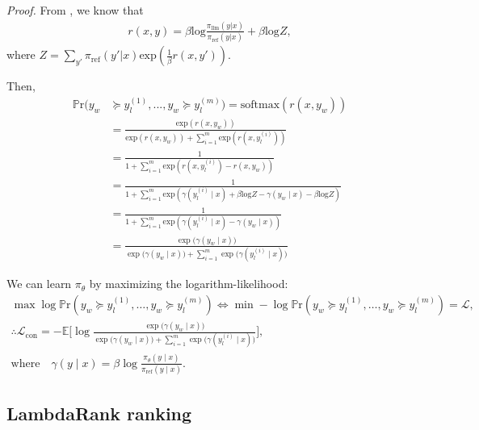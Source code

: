 \textit{Proof.}
From \citep{rafailov2024direct}, we know that
\begin{gather}
    r(x, y) = \beta \text{log} \frac{\pi_{\text{llm}}(y|x)}{\pi_{\text{ref}}(y|x)} + \beta \text{log} Z,
\end{gather}
where $Z = \sum_{y'} \pi_{\text{ref}}(y'|x) \text{exp}(\frac{1}{\beta} r(x, y'))$.

Then,
\begin{equation}\label{eq:1-n}
\begin{aligned}
\mathbb{P}\text{r}(y_w & \succeq y^{(1)}_l, ..., y_w \succeq y^{(m)}_l) 
= \text{softmax}(r(x, y_w)) \\
&= \frac{\text{exp}(r(x,y_w))}{\text{exp}(r(x,y_w)) + \sum^m_{i=1}\text{exp}(r(x,y^{(i)}_l))} \\
&= \frac{1}{1 + \sum^m_{i=1}\text{exp}(r(x,y^{(i)}_l)-r(x,y_w))} \\
&= \frac{1}{1 + \sum^m_{i=1}\text{exp}(\gamma(y^{(i)}_l \mid x) + \beta \text{log} Z - \gamma(y_w \mid x) - \beta \text{log} Z)} \\
&= \frac{1}{1 + \sum^m_{i=1}\text{exp}(\gamma(y^{(i)}_l \mid x) - \gamma(y_w \mid x))} \\
&= \frac{\exp\bigl(\gamma(y_w \mid x)\bigr)}{
        \exp\bigl(\gamma(y_w \mid x)\bigr) + \sum_{i=1}^m \exp\bigl(\gamma(y_l^{(i)} \mid x)\bigr)}
\end{aligned}
\end{equation}

We can learn $\pi_\theta$ by maximizing the logarithm-likelihood: 
\begin{gather}
\max \log \mathbb{P}\text{r}(y_w \succeq y^{(1)}_l, \dots, y_w \succeq y^{(m)}_l) \Leftrightarrow 
\min - \log \mathbb{P}\text{r}(y_w \succeq y^{(1)}_l, \dots, y_w \succeq y^{(m)}_l) = \mathcal{L}, \\
 \therefore \mathcal{L}_{\text{con}} = -\mathbb{E} \biggl[
    \log \frac{\exp\bigl(\gamma(y_w \mid x)\bigr)}{
        \exp\bigl(\gamma(y_w \mid x)\bigr) + \sum_{i=1}^m \exp\bigl(\gamma(y_l^{(i)} \mid x)\bigr)}
    \biggr], \\
\text{where} \quad \gamma(y \mid x) = \beta \log \frac{\pi_\theta(y \mid x)}{\pi_{\mathrm{ref}}(y \mid x)}.
\end{gather}



\subsection{LambdaRank ranking}\label{apx:proof:lambdarank}

